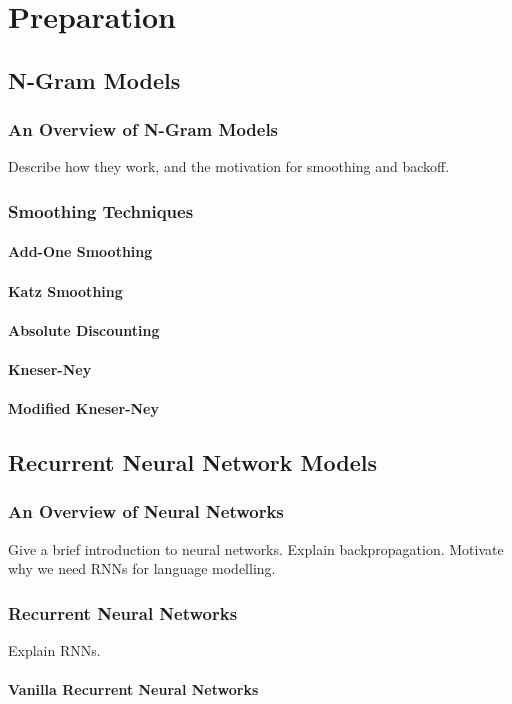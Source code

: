 \documentclass[a4paper, 12pt]{report}
\begin{document}
\chapter{Preparation}
\section{N-Gram Models}
\subsection{An Overview of N-Gram Models}
Describe how they work, and the motivation for smoothing and backoff.
\subsection{Smoothing Techniques}
\subsubsection{Add-One Smoothing}
\subsubsection{Katz Smoothing}
\subsubsection{Absolute Discounting}
\subsubsection{Kneser-Ney}
\subsubsection{Modified Kneser-Ney}
\section{Recurrent Neural Network Models}
\subsection{An Overview of Neural Networks}
Give a brief introduction to neural networks. Explain backpropagation. Motivate why we need RNNs for language modelling.
\subsection{Recurrent Neural Networks}
Explain RNNs.
\subsubsection{Vanilla Recurrent Neural Networks}
\end{document}
